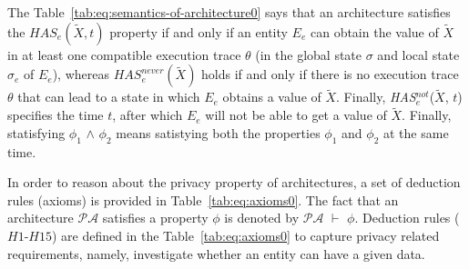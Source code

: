 \documentclass[a4paper]{article}
\begin{document}
The Table~\ref{tab:eq:semantics-of-architecture0} says that an architecture satisfies the $\textit{HAS}_e(\tilde{X}, t)$ property if and only if an entity $E_e$ can obtain the value of $\tilde{X}$ in at least one compatible execution trace $\theta$ (in the global state $\sigma$ and local state $\sigma_e$ of $E_e$), whereas $ \textit{HAS}_e^{\textit{never}}(\tilde{X})$ holds if and only if there is no execution trace $\theta$ that can lead to a state in which $E_e$ obtains a 
value of $\tilde{X}$. Finally, \textit{HAS}$^{\textit{not}}_e$($\tilde{X}$, $t$) specifies the time $t$, after which $E_e$ will not be able to get a value of $\tilde{X}$. Finally, statisfying $\phi_1$ $\wedge$ $\phi_2$ means satistying both the properties $\phi_1$ and $\phi_2$ at the same time. 
     
In order to reason about the privacy property of architectures, a set of deduction rules (axioms) is provided in Table~\ref{tab:eq:axioms0}. The fact that an architecture $\mathcal{P}\mathcal{A}$ satisfies a property $\phi$ is denoted by $\mathcal{P}\mathcal{A}$ $\vdash$ $\phi$. Deduction rules ($H1$-$H15$) are defined in the Table~\ref{tab:eq:axioms0} to capture privacy related requirements, namely, investigate whether an entity can have a given data. 
\end{document}
